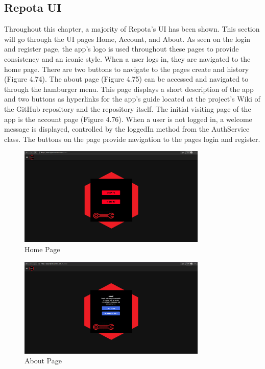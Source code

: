 \subsection{Repota UI}
Throughout this chapter, a majority of Repota's UI has been shown. This section will go through the UI pages Home, Account, and About. As seen on the login and register page, the app's logo is used throughout these pages to provide consistency and an iconic style. When a user logs in, they are navigated to the home page. There are two buttons to navigate to the pages create and history (Figure 4.74). The about page (Figure 4.75) can be accessed and navigated to through the hamburger menu. This page displays a short description of the app and two buttons as hyperlinks for the app's guide located at the project's Wiki of the GitHub repository and the repository itself. The initial visiting page of the app is the account page (Figure 4.76). When a user is not logged in, a welcome message is displayed, controlled by the loggedIn method from the AuthService class. The buttons on the page provide navigation to the pages login and register. 

\begin{figure}[H]
    \centering
    \caption{Home Page}
    \label{image:homePage}
    \includegraphics[width=0.8\textwidth]{images/repota/UI/home-page.png}
\end{figure}

\begin{figure}[H]
    \centering
    \caption{About Page}
    \label{image:aboutPage}
    \includegraphics[width=0.8\textwidth]{images/repota/UI/about.png}
\end{figure}

